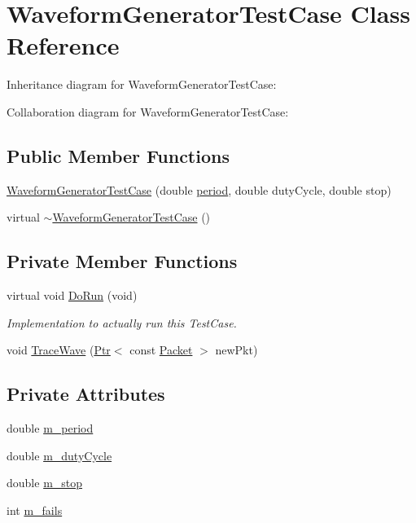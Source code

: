 \hypertarget{classWaveformGeneratorTestCase}{}\section{Waveform\+Generator\+Test\+Case Class Reference}
\label{classWaveformGeneratorTestCase}


Inheritance diagram for Waveform\+Generator\+Test\+Case\+:


Collaboration diagram for Waveform\+Generator\+Test\+Case\+:
\subsection*{Public Member Functions}
\begin{DoxyCompactItemize}
\item 
\hyperlink{classWaveformGeneratorTestCase_adf92d5c7ab425f03355cf1279cd0f84d}{Waveform\+Generator\+Test\+Case} (double \hyperlink{mmwave_2model_2fading-traces_2fading__trace__generator_8m_ae10c944bf9f3fba2686a5885ecc192d7}{period}, double duty\+Cycle, double stop)
\item 
virtual \hyperlink{classWaveformGeneratorTestCase_a8f8b1a9d0c20d9e50baac26f8fb2aa79}{$\sim$\+Waveform\+Generator\+Test\+Case} ()
\end{DoxyCompactItemize}
\subsection*{Private Member Functions}
\begin{DoxyCompactItemize}
\item 
virtual void \hyperlink{classWaveformGeneratorTestCase_afc4a2a06f2340f858d030d1b3b5056f3}{Do\+Run} (void)
\begin{DoxyCompactList}\small\item\em Implementation to actually run this Test\+Case. \end{DoxyCompactList}\item 
void \hyperlink{classWaveformGeneratorTestCase_aa5684138161b52c395232f379dba4ad4}{Trace\+Wave} (\hyperlink{classns3_1_1Ptr}{Ptr}$<$ const \hyperlink{classns3_1_1Packet}{Packet} $>$ new\+Pkt)
\end{DoxyCompactItemize}
\subsection*{Private Attributes}
\begin{DoxyCompactItemize}
\item 
double \hyperlink{classWaveformGeneratorTestCase_a06cd8548960215ff413acaff8e72631e}{m\+\_\+period}
\item 
double \hyperlink{classWaveformGeneratorTestCase_aeabd37e15d4d2ca22851c2a824d63752}{m\+\_\+duty\+Cycle}
\item 
double \hyperlink{classWaveformGeneratorTestCase_aae568120afb7efd05030660064038668}{m\+\_\+stop}
\item 
int \hyperlink{classWaveformGeneratorTestCase_a1597fb05aa37db8e7aee37531b6ab1f2}{m\+\_\+fails}
\end{DoxyCompactItemize}
